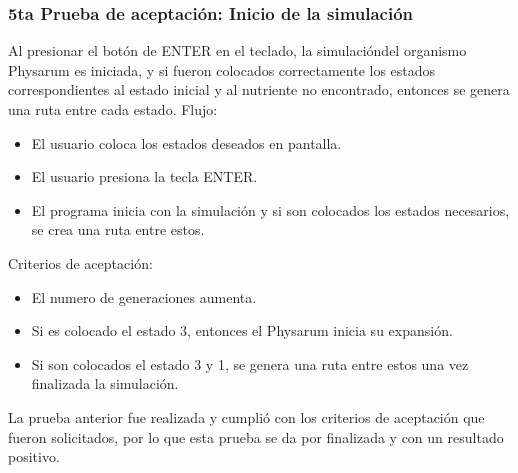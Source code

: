     \subsubsection{5ta Prueba de aceptaci\'on: Inicio de la simulaci\'on}
    Al presionar el bot\'on de ENTER en el teclado, la simulaci\'ondel organismo Physarum es iniciada, y si fueron colocados
        correctamente los estados correspondientes al estado inicial
        y al nutriente no encontrado, entonces se genera una ruta
        entre cada estado.
    \vskip 0.5cm
    Flujo:
    \begin{itemize}
        \item El usuario coloca los estados deseados en pantalla.
        \item El usuario presiona la tecla ENTER.
        \item El programa inicia con la simulaci\'on y si son colocados
        los estados necesarios, se crea una ruta entre estos.
    \end{itemize}
    \vskip 0.5cm
    Criterios de aceptaci\'on:
    \begin{itemize}
        \item El numero de generaciones aumenta.
        \item Si es colocado el estado 3, entonces el Physarum inicia
        su expansi\'on.
        \item Si son colocados el estado 3 y 1, se genera una ruta entre
        estos una vez finalizada la simulaci\'on.
    \end{itemize}
    \vskip 0.5cm
    La prueba anterior fue realizada y cumpli\'o con los criterios
        de aceptaci\'on que fueron solicitados, por lo que esta prueba
        se da por finalizada y con un resultado positivo.